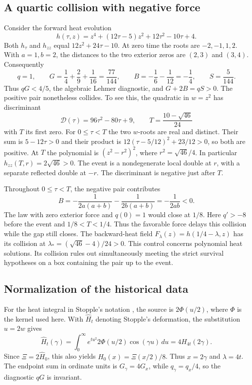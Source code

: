 \subsection{A quartic collision with negative force}

Consider the forward heat evolution
\begin{equation}
 h(\tau,z)=z^4+(12\tau-5)z^2+12\tau^2-10\tau+4 .
 \label{eq:lehmer-quartic}
\end{equation}
Both \(h_\tau\) and \(h_{zz}\) equal \(12z^2+24\tau-10\).
At zero time the roots are \(-2,-1,1,2\). With \(a=1,b=2\),
the distances to the two exterior zeros are \((2,3)\) and \((3,4)\).
Consequently
\[
 q=1,\qquad G=\frac14+\frac29+\frac1{16}=\frac{77}{144},
 \qquad B=-\frac16-\frac1{12}=-\frac14,\qquad S=\frac5{144}.
\]
Thus \(qG<4/5\), the algebraic Lehmer diagnostic, and
\(G+2B=qS>0\). The positive pair nonetheless collides. To see this,
the quadratic in \(w=z^2\) has discriminant
\[
 \mathcal D(\tau)=96\tau^2-80\tau+9,\qquad
 T=\frac{10-\sqrt{46}}{24}
\]
with \(T\) its first zero. For \(0\le\tau<T\) the two \(w\)-roots
are real and distinct. Their sum is \(5-12\tau>0\) and their
product is \(12(\tau-5/12)^2+23/12>0\), so both are positive.
At \(T\) the polynomial is \((z^2-r^2)^2\), where
\(r^2=\sqrt{46}/4\). In particular \(h_{zz}(T,r)=2\sqrt{46}>0\).
The event is a nondegenerate local double at \(r\), with a separate
reflected double at \(-r\). The discriminant is negative just
after \(T\).

Throughout \(0\le\tau<T\), the negative pair contributes
\[
 B=-\frac{1}{2a(a+b)}-\frac{1}{2b(a+b)}=-\frac{1}{2ab}<0 .
\]
The law with zero exterior force and \(q(0)=1\) would close at
\(1/8\). Here \(q'>-8\) before the event and \(1/8<T<1/4\).
Thus the favorable force delays this collision while the gap
still closes. The backward-heat field
\(F_\lambda(z)=h(1/4-\lambda,z)\) has its collision at
\(\lambda_*=(\sqrt{46}-4)/24>0\). This control concerns
polynomial heat solutions. Its collision rules out simultaneously
meeting the strict survival hypotheses on a box containing the
pair up to the event.

\subsection{Normalization of the historical data}

For the heat integral in Stopple's notation \cite{Stopple}, the source
is \(2\Phi(u/2)\), where \(\Phi\) is the kernel used here. With
\(\widehat H_t\) denoting Stopple's deformation, the substitution
\(u=2w\) gives
\[
 \widehat H_t(\gamma)
   =\int_0^\infty e^{tu^2}2\Phi(u/2)\cos(\gamma u)\,du
   =4 H_{4t}(2\gamma).
\]
Since \(\Xi=2\widehat H_0\), this also yields
\(H_0(x)=\Xi(x/2)/8\). Thus \(x=2\gamma\) and \(\lambda=4t\).
The endpoint sum in ordinate units is \(G_\gamma=4G_x\),
while \(q_\gamma=q_x/4\), so the diagnostic \(qG\) is invariant.
